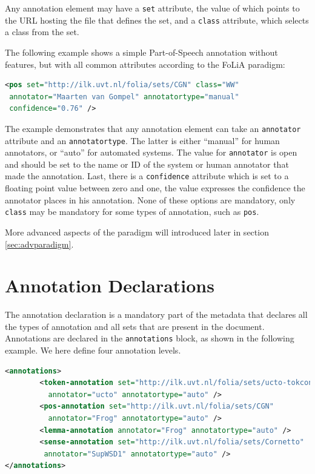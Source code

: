 \documentclass[a4paper,12pt]{report}
\begin{document}
Any annotation element may have a \texttt{set} attribute, the value of which points to the URL hosting the file that defines the set, and a \texttt{class} attribute, which selects a class from the set.

The following example shows a simple Part-of-Speech annotation without features, but with all common attributes according to the FoLiA paradigm:

\begin{lstlisting}[language=xml]
<pos set="http://ilk.uvt.nl/folia/sets/CGN" class="WW" 
 annotator="Maarten van Gompel" annotatortype="manual"
 confidence="0.76" />
\end{lstlisting}

The example demonstrates that any annotation element can take an \texttt{annotator} attribute and an \texttt{annotatortype}. The latter is either ``manual'' for human annotators, or ``auto'' for automated systems.  The value for \texttt{annotator} is open and should be set to the name or ID of the system or human annotator that made the annotation. Last, there is a \texttt{confidence} attribute which is set to a floating point value between zero and one, the value expresses the confidence the annotator places in his annotation. None of these options are mandatory, only \texttt{class} may be mandatory for some types of annotation, such as \texttt{pos}.

More advanced aspects of the paradigm will introduced later in section \ref{sec:advparadigm}.

\section{Annotation Declarations}


The annotation declaration is a mandatory part of the metadata that declares all the types of annotation and all sets that are present in the document. Annotations are declared in the \texttt{annotations} block, as shown in the following example. We here define four annotation levels.

\begin{lstlisting}[language=xml]
<annotations>
        <token-annotation set="http://ilk.uvt.nl/folia/sets/ucto-tokconfig-nl" 
          annotator="ucto" annotatortype="auto" />
        <pos-annotation set="http://ilk.uvt.nl/folia/sets/CGN" 
          annotator="Frog" annotatortype="auto" />
        <lemma-annotation annotator="Frog" annotatortype="auto" />    
        <sense-annotation set="http://ilk.uvt.nl/folia/sets/Cornetto"
         annotator="SupWSD1" annotatortype="auto" />    
</annotations>
\end{lstlisting}
\end{document}
